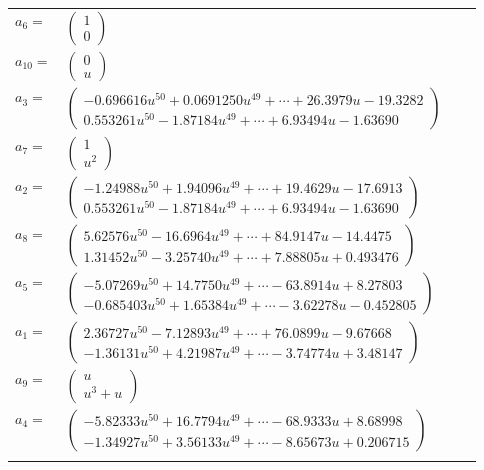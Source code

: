 \documentclass[1p]{elsarticle_modified}
\theoremstyle{definition}
\begin{document}
\begin{tabular}{m{7pt} m{180pt} m{7pt} m{180pt} }
\flushright $a_{6}=$&$\begin{pmatrix}1\\0\end{pmatrix}$ \\
\flushright $a_{10}=$&$\begin{pmatrix}0\\u\end{pmatrix}$ \\
\flushright $a_{3}=$&$\begin{pmatrix}-0.696616 u^{50}+0.0691250 u^{49}+\cdots+26.3979 u-19.3282\\0.553261 u^{50}-1.87184 u^{49}+\cdots+6.93494 u-1.63690\end{pmatrix}$ \\
\flushright $a_{7}=$&$\begin{pmatrix}1\\u^2\end{pmatrix}$ \\
\flushright $a_{2}=$&$\begin{pmatrix}-1.24988 u^{50}+1.94096 u^{49}+\cdots+19.4629 u-17.6913\\0.553261 u^{50}-1.87184 u^{49}+\cdots+6.93494 u-1.63690\end{pmatrix}$ \\
\flushright $a_{8}=$&$\begin{pmatrix}5.62576 u^{50}-16.6964 u^{49}+\cdots+84.9147 u-14.4475\\1.31452 u^{50}-3.25740 u^{49}+\cdots+7.88805 u+0.493476\end{pmatrix}$ \\
\flushright $a_{5}=$&$\begin{pmatrix}-5.07269 u^{50}+14.7750 u^{49}+\cdots-63.8914 u+8.27803\\-0.685403 u^{50}+1.65384 u^{49}+\cdots-3.62278 u-0.452805\end{pmatrix}$ \\
\flushright $a_{1}=$&$\begin{pmatrix}2.36727 u^{50}-7.12893 u^{49}+\cdots+76.0899 u-9.67668\\-1.36131 u^{50}+4.21987 u^{49}+\cdots-3.74774 u+3.48147\end{pmatrix}$ \\
\flushright $a_{9}=$&$\begin{pmatrix}u\\u^3+u\end{pmatrix}$ \\
\flushright $a_{4}=$&$\begin{pmatrix}-5.82333 u^{50}+16.7794 u^{49}+\cdots-68.9333 u+8.68998\\-1.34927 u^{50}+3.56133 u^{49}+\cdots-8.65673 u+0.206715\end{pmatrix}$\\&\end{tabular}
\end{document}

